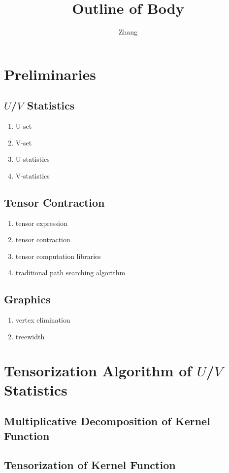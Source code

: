 \documentclass[letterpaper,11pt]{article}
\title{Outline of Body}
\author{Zhang}
\newcommand{\pdfu}{\texorpdfstring{$U$}{U}}
\newcommand{\pdfv}{\texorpdfstring{$V$}{V}}
\begin{document}
\maketitle

\section{Preliminaries}
\subsection{\pdfu{}/\pdfv{} Statistics}
\begin{enumerate}
    \item U-set
    \item V-set
    \item U-statistics
    \item V-statistics
\end{enumerate}
\subsection{Tensor Contraction}
\begin{enumerate}
    \item tensor expression
    \item tensor contraction
    \item tensor computation libraries
    \item traditional path searching algorithm
\end{enumerate}
\subsection{Graphics}
\begin{enumerate}
    \item vertex elimination
    \item treewidth
\end{enumerate}

\section{Tensorization Algorithm of \texorpdfstring{$U$}{U}/\texorpdfstring{$V$}{V} Statistics}
\subsection{Multiplicative Decomposition of Kernel Function}
\subsection{Tensorization of Kernel Function}
\end{document}
